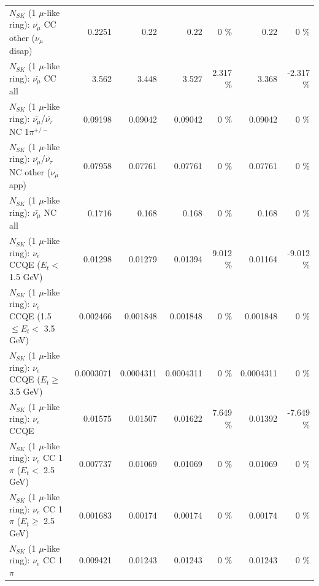 \begin{table}
\begin{tabular}{| l | r | r | r  r | r  r |}
        $N_{SK}$ (1 $\mu$-like ring): $\bar{\nu_\mu}$ CC other ($\nu_\mu$ disap) &          0.2251 &            0.22 &            0.22 &        0 \%  &            0.22 &        0 \%  \\ 
                          $N_{SK}$ (1 $\mu$-like ring): $\bar{\nu_{\mu}}$ CC all &           3.562 &           3.448 &           3.527 &    2.317 \%  &           3.368 &   -2.317 \%  \\ 
\hline
  $N_{SK}$ (1 $\mu$-like ring): $\bar{\nu_\mu}$/$\bar{\nu_\tau}$ NC 1$\pi^{+/-}$ &         0.09198 &         0.09042 &         0.09042 &        0 \%  &         0.09042 &        0 \%  \\ 
$N_{SK}$ (1 $\mu$-like ring): $\bar{\nu_\mu}$/$\bar{\nu_\tau}$ NC other ($\nu_\mu$ app) &         0.07958 &         0.07761 &         0.07761 &        0 \%  &         0.07761 &        0 \%  \\ 
                          $N_{SK}$ (1 $\mu$-like ring): $\bar{\nu_{\mu}}$ NC all &          0.1716 &           0.168 &           0.168 &        0 \%  &           0.168 &        0 \%  \\ 
\hline
\hline
\hline
                  $N_{SK}$ (1 $\mu$-like ring): $\nu_e$ CCQE ($E_{t} <$ 1.5 GeV) &         0.01298 &         0.01279 &         0.01394 &    9.012 \%  &         0.01164 &   -9.012 \%  \\ 
         $N_{SK}$ (1 $\mu$-like ring): $\nu_e$ CCQE (1.5 $\leq E_{t} <$ 3.5 GeV) &        0.002466 &        0.001848 &        0.001848 &        0 \%  &        0.001848 &        0 \%  \\ 
               $N_{SK}$ (1 $\mu$-like ring): $\nu_e$ CCQE ($E_{t} \geq$ 3.5 GeV) &       0.0003071 &       0.0004311 &       0.0004311 &        0 \%  &       0.0004311 &        0 \%  \\ 
\hline
                                      $N_{SK}$ (1 $\mu$-like ring): $\nu_e$ CCQE &         0.01575 &         0.01507 &         0.01622 &    7.649 \%  &         0.01392 &   -7.649 \%  \\ 
\hline
             $N_{SK}$ (1 $\mu$-like ring): $\nu_e$ CC 1$\pi$ ($E_{t} <$ 2.5 GeV) &        0.007737 &         0.01069 &         0.01069 &        0 \%  &         0.01069 &        0 \%  \\ 
          $N_{SK}$ (1 $\mu$-like ring): $\nu_e$ CC 1$\pi$ ($E_{t} \geq$ 2.5 GeV) &        0.001683 &         0.00174 &         0.00174 &        0 \%  &         0.00174 &        0 \%  \\ 
\hline
                                 $N_{SK}$ (1 $\mu$-like ring): $\nu_e$ CC 1$\pi$ &        0.009421 &         0.01243 &         0.01243 &        0 \%  &         0.01243 &        0 \%  \\ 

\end{tabular}
\end{table}
